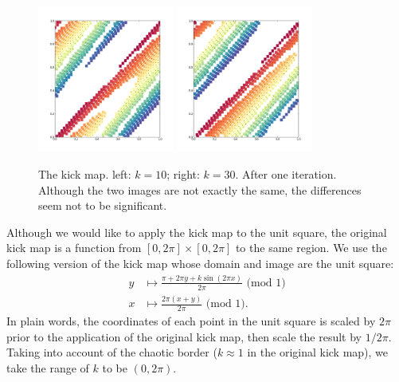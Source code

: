 \documentclass[12pt]{article}
\begin{document}
\begin{figure}[t]
  \centering
  \includegraphics[width=0.4\textwidth]{kickmap_2pi}
  \hspace{2cm}
  \includegraphics[width=0.4\textwidth]{kickmap_3pi}
  \caption{The kick map. left: $k=10$; right: $k = 30$. After one iteration. 
    Although the two images are not exactly the same, the differences seem not to be significant.
  }
  \label{fig:kickmap_demo2}
\end{figure}

Although we would like to apply the kick map to the unit square, the original kick map is a function from $[0,2\pi] \times [0,2\pi]$ to the same region.
We use the following version of the kick map whose domain and image are the unit square:
\begin{align*}
  y &\mapsto \frac{\pi + 2\pi y + k \sin (2\pi x)}{2\pi} \mbox{ (mod 1)}\\
  x &\mapsto \frac{2\pi (x + y)}{2\pi} \mbox{ (mod 1)}.
\end{align*}
In plain words, the coordinates of each point in the unit square is scaled by $2\pi$ prior to the application of the original kick map, then scale the result by $1/2\pi$.
Taking into account of the chaotic border ($k\approx 1$ in the original kick map), we take the range of $k$ to be $(0,2\pi)$.
\end{document}
